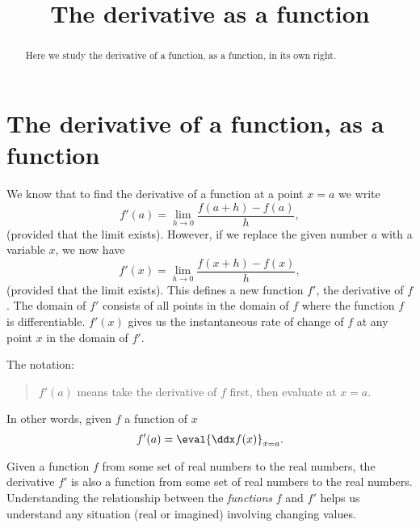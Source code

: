 \documentclass{ximera}
\title[Dig-in:]{The derivative as a function}
\begin{document}
\begin{abstract}
Here we study the derivative of a function, as a function, in its own
right.
\end{abstract}
\maketitle

\section{The derivative of a function, as a function}


We know that to find the derivative of a function at a point $x=a$ we
write
\[
f'(a) = \lim_{h\to 0}\frac{f(a+h)-f(a)}{h},
\]
(provided that the limit exists).
However, if we replace the given number $a$ with a variable $x$, we now
have
\[
f'(x) = \lim_{h\to 0}\frac{f(x+h)-f(x)}{h},
\]
(provided that the limit exists).
This defines a new function $f'$, the derivative of $f$. The domain of $f'$ consists of all points in the domain of $f$ where the function $f$ is differentiable.
$f'(x)$ gives us the instantaneous rate of change of $f$ at any point $x$ in the domain of $f'$.\\
\begin{warning}
  The notation:
  \begin{quote}
  $f'(a)$ means take the derivative of $f$ first, then evaluate at
    $x=a$.
  \end{quote}
  In other words, given $f$ a function of $x$
  \[
  f'(a) = \eval{\ddx f(x)}_{x=a}.
  \]
\end{warning}
Given a function $f$ from  some set of real numbers to the real numbers, the
derivative $f'$ is also a function from some set of real numbers to the real
numbers. Understanding the relationship between the \textit{functions}
$f$ and $f'$ helps us understand any situation (real or imagined)
involving changing values. 
\end{document}
